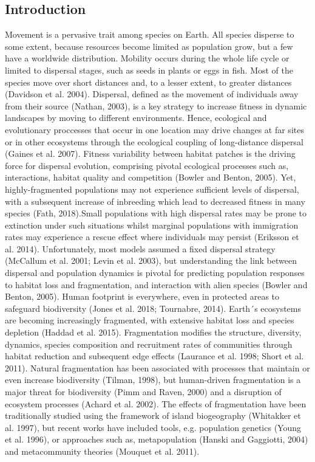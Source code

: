 \documentclass[12pt]{article}
\begin{document}
\begin{flushleft}
\section{Introduction}
Movement is a pervasive trait among species on Earth. All species disperse to some extent, because resources become limited as population grow, but a few have a worldwide distribution. Mobility occurs during the whole life cycle or limited to dispersal stages, such as seeds in plants or eggs in fish. Most of the species move over short distances and, to a lesser extent, to greater distances (Davidson et al. 2004). Dispersal, defined as the movement of individuals away from their source (Nathan, 2003), is a key strategy to increase fitness in dynamic landscapes by moving to different environments. Hence, ecological and evolutionary proccesses that occur in one location may drive changes at far sites or in other ecosystems through the ecological coupling of long-distance dispersal (Gaines et al. 2007). Fitness variability between habitat patches is the driving force for dispersal evolution, comprising pivotal ecological processes such as, interactions, habitat quality and competition (Bowler and Benton, 2005). Yet, highly-fragmented populations may not experience sufficient levels of dispersal, with a subsequent increase of inbreeding which lead to decreased fitness in many species (Fath, 2018).Small populations with high dispersal rates may be prone to extinction under such situations  whilst marginal populations with immigration rates may experience a rescue effect where individuals may persist (Eriksson et al. 2014). Unfortunately, most models assumed a fixed dispersal strategy (McCallum et al. 2001; Levin et al. 2003), but understanding the link between dispersal and population dynamics is pivotal for predicting population responses to habitat loss and fragmentation, and interaction with alien species (Bowler and Benton, 2005).
Human footprint is everywhere, even in protected areas to safeguard biodiversity (Jones et al. 2018; Tournabre, 2014). Earth´s ecosystems are becoming increasingly fragmented, with extensive habitat loss and species depletion (Haddad et al. 2015). Fragmentation modifies the structure, diversity, dynamics, species composition and recruitment rates of communities through habitat reduction and subsequent edge effects (Laurance et al. 1998; Short et al. 2011). Natural fragmentation has been associated with processes that maintain or even increase biodiversity (Tilman, 1998), but human-driven fragmentation is a major threat for biodiversity (Pimm and Raven, 2000) and a disruption of ecosystem processes (Achard et al. 2002). The effects of fragmentation have been traditionally studied using the framework of island biogeography (Whitakker et al. 1997), but recent works have included tools, e.g. population genetics (Young et al. 1996), or approaches such as, metapopulation (Hanski and Gaggiotti, 2004) and metacommunity theories (Mouquet et al. 2011).

\end{flushleft}
\end{document}
